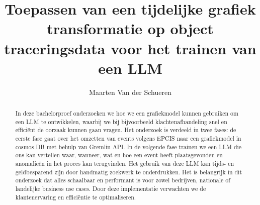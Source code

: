 \documentclass{hogent-article}
\title{Toepassen van een tijdelijke grafiek transformatie op object traceringsdata voor het trainen van een LLM}
\author{Maarten Van der Schueren}
\begin{document}
\begin{abstract}
In deze bachelorproef onderzoeken we hoe we een grafiekmodel kunnen gebruiken om een LLM te ontwikkelen, waarbij we bij bijvoorbeeld klachtenafhandeling snel en efficiënt de oorzaak kunnen gaan vragen.
Het onderzoek is verdeeld in twee fases: de eerste fase gaat over het omzetten van events volgens EPCIS naar een grafiekmodel in cosmos DB met behulp van Gremlin API.
In de volgende fase trainen we een LLM die ons kan vertellen waar, wanneer, wat en hoe een event heeft plaatsgevonden en anomalieën in het proces kan terugvinden.
Het gebruik van deze LLM kan tijds- en geldbesparend zijn door handmatig zoekwerk te onderdrukken. Het is belangrijk in dit onderzoek dat alles schaalbaar en performant is voor zowel bedrijven, nationale of landelijke business use cases.
Door deze implementatie verwachten we de klantenervaring en efficiëntie te optimaliseren.
\end{abstract}

\tableofcontents


\newpage
\printbibliography[heading=bibintoc]
\end{document}
